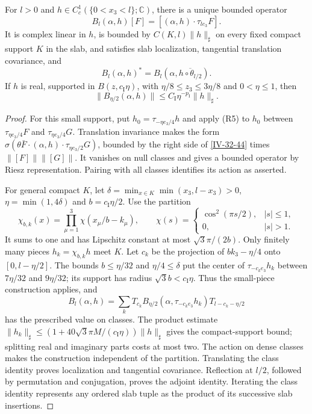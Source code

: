 \documentclass[11pt,letterpaper,reqno]{amsart}
\makeatletter
\theoremstyle{definition}
\newcommand{\ms@minorstart}{%
  \pushQED{\qed}\renewcommand{\qedsymbol}{$\blacksquare$}}
\newenvironment{proposition}[1][]{\ms@minorstart\ms@proposition[#1]}
  {\popQED\endms@proposition}
\theoremstyle{remark}
\makeatother
\begin{document}
\begin{proposition}[Slab insertions]\label{IV-32-38}
For $l>0$ and $h\in C_c^1(\{0<x_3<l\};\mathbb C)$,
there is a unique bounded operator
\[
 B_l(\alpha,h)[F]=[(\alpha,h)\cdot\tau_{le_3}F].
\]
It is complex linear in $h$, is bounded by
$C(K,l)\|h\|_\sharp$ on every fixed compact support
$K$ in the slab, and satisfies slab localization,
tangential translation covariance, and
\[
 B_l(\alpha,h)^*=B_l(\alpha,\overline{h\circ\theta_{l/2}}).
\]
If $h$ is real, supported in $B(z,c_{\mathrm I}\eta)$,
with $\eta/8\le z_3\le3\eta/8$ and $0<\eta\le1$, then
\begin{equation}\label{IV-32-44}
 \|B_{\eta/2}(\alpha,h)\|
                \le C_{\mathrm I}\eta^{-p_{\mathrm I}}\|h\|_\sharp.
\end{equation}
\end{proposition}
\begin{proof}
For this small support, put $h_0=\tau_{-\eta e_3/4}h$
and apply (R5) to $h_0$ between
$\tau_{\eta e_3/4}F$ and $\tau_{\eta e_3/4}G$.
Translation invariance makes the form
$\sigma(\theta\bar F\cdot(\alpha,h)\cdot\tau_{\eta e_3/2}G)$,
bounded by the right side of \eqref{IV-32-44} times
$\|[F]\|\|[G]\|$. It vanishes on null classes and gives
a bounded operator by Riesz representation. Pairing with
all classes identifies its action as asserted.

For general compact $K$, let
$\delta=\min_{x\in K}\min(x_3,l-x_3)>0$,
$\eta=\min(1,4\delta)$ and $b=c_{\mathrm I}\eta/2$.
Use the partition
\[
 \chi_{b,k}(x)=\prod_{\mu=1}^3\chi(x_\mu/b-k_\mu),\qquad
 \chi(s)=\begin{cases}\cos^2(\pi s/2),&|s|\le1,\\0,&|s|>1.
 \end{cases}
\]
It sums to one and has Lipschitz constant at most
$\sqrt3\pi/(2b)$. Only finitely many pieces
$h_k=\chi_{b,k}h$ meet $K$. Let $c_k$ be the projection
of $bk_3-\eta/4$ onto $[0,l-\eta/2]$.
The bounds $b\le\eta/32$ and $\eta/4\le\delta$ put the
center of $\tau_{-c_ke_3}h_k$ between $7\eta/32$ and
$9\eta/32$; its support has radius
$\sqrt3b<c_{\mathrm I}\eta$. Thus the small-piece
construction applies, and
\[
 B_l(\alpha,h)=\sum_k T_{c_k}
 B_{\eta/2}(\alpha,\tau_{-c_ke_3}h_k)T_{l-c_k-\eta/2}
\]
has the prescribed value on classes. The product estimate
$\|h_k\|_\sharp\le
(1+40\sqrt3\pi M/(c_{\mathrm I}\eta))\|h\|_\sharp$
gives the compact-support bound; splitting real and
imaginary parts costs at most two. The action on dense
classes makes the construction independent of the partition.
Translating the class identity proves localization and
tangential covariance. Reflection at $l/2$, followed by
permutation and conjugation, proves the adjoint identity.
Iterating the class identity represents any ordered slab
tuple as the product of its successive slab insertions.
\end{proof}
\end{document}

